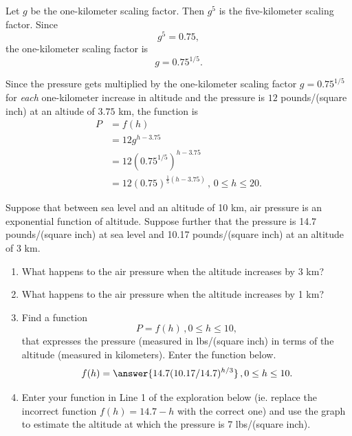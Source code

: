 \documentclass{ximera}
\begin{document}
\begin{question}
\begin{explanation}
\item Let $g$ be the one-kilometer scaling factor. Then $g^5$ is the five-kilometer scaling factor. Since
\[
 g^5 = 0.75 ,
\]
the one-kilometer scaling factor is
\[
  g = 0.75^{1/5}.
\]

\item Since the pressure gets multiplied by the one-kilometer scaling factor $g = 0.75^{1/5}$ for \emph{each} one-kilometer increase in altitude and the pressure is $12$ pounds/(square inch) at an altiude of $3.75$ km, the function is
\begin{align*}
 P &= f(h)  \\
    &= 12 g^{h-3.75} \\
    &= 12 \left( 0.75^{1/5} \right)^{h-3.75} \\
    &= 12 (0.75)^{\frac{1}{5}(h-3.75)} \, , \, 0\leq h \leq 20.
\end{align*}

\end{explanation}

\end{question}

\begin{question}   \label{Q88:ExpentialG}
Suppose that between sea level and an altitude of 10 km,  air pressure is an exponential function of altitude. Suppose further that the pressure is 14.7 pounds/(square inch) at sea level and 10.17 pounds/(square inch) at an altitude of 3 km.

\begin{enumerate}
\item What happens to the air pressure when the altitude increases by 3 km?

\item What happens to the air pressure when the altitude increases by 1 km?

\item Find a function
\[
    P = f(h) \, , 0\leq h \leq 10,
\]
that expresses the pressure (measured in lbs/(square inch) in terms of the altitude (measured in kilometers). Enter the function below.
\[
      f(h) = \answer{14.7(10.17/14.7)^{h/3}} \, , 0\leq h \leq 10 .
\]

\item Enter your function in Line 1 of the exploration below (ie. replace the incorrect function $f(h)=14.7-h$ with the correct one) and use the graph to estimate the altitude at which the pressure is 7 lbs/(square inch).


 
\begin{onlineOnly}
    \begin{center}
\end{center}
\end{onlineOnly}

\end{enumerate}
\end{question}
\end{document}

